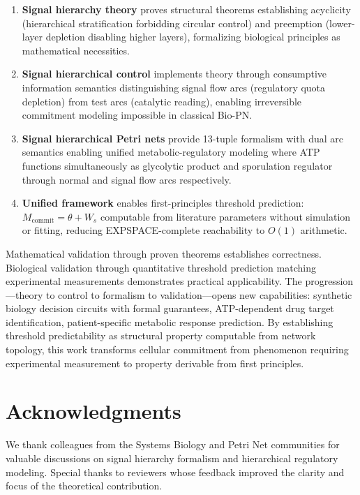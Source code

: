\documentclass[10pt,letterpaper]{article}
\begin{document}
\begin{enumerate}
\item \textbf{Signal hierarchy theory} proves structural theorems establishing acyclicity (hierarchical stratification forbidding circular control) and preemption (lower-layer depletion disabling higher layers), formalizing biological principles as mathematical necessities.

\item \textbf{Signal hierarchical control} implements theory through consumptive information semantics distinguishing signal flow arcs (regulatory quota depletion) from test arcs (catalytic reading), enabling irreversible commitment modeling impossible in classical Bio-PN.

\item \textbf{Signal hierarchical Petri nets} provide 13-tuple formalism with dual arc semantics enabling unified metabolic-regulatory modeling where ATP functions simultaneously as glycolytic product and sporulation regulator through normal and signal flow arcs respectively.

\item \textbf{Unified framework} enables first-principles threshold prediction: $M_{\text{commit}} = \theta + W_s$ computable from literature parameters without simulation or fitting, reducing EXPSPACE-complete reachability to $O(1)$ arithmetic.
\end{enumerate}

Mathematical validation through proven theorems establishes correctness. Biological validation through quantitative threshold prediction matching experimental measurements demonstrates practical applicability. The progression---theory to control to formalism to validation---opens new capabilities: synthetic biology decision circuits with formal guarantees, ATP-dependent drug target identification, patient-specific metabolic response prediction. By establishing threshold predictability as structural property computable from network topology, this work transforms cellular commitment from phenomenon requiring experimental measurement to property derivable from first principles.

\section*{Acknowledgments}

We thank colleagues from the Systems Biology and Petri Net communities for valuable discussions on signal hierarchy formalism and hierarchical regulatory modeling. Special thanks to reviewers whose feedback improved the clarity and focus of the theoretical contribution.
\end{document}
